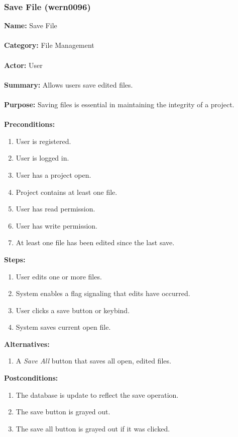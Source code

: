 \documentclass[11pt]{report}
\begin{document}
\subsubsection{Save File (wern0096)}
\begin{framed}
	\noindent\textbf{Name:} Save File \\ \\
	\textbf{Category:} File Management \\ \\
	\textbf{Actor:} User \\ \\
	\textbf{Summary:} Allows users save edited files. \\ \\
	\textbf{Purpose:} Saving files is essential in maintaining the integrity of a project. \\ \\
	\textbf{Preconditions:} 
	\begin{enumerate}
		\item User is registered.
		\item User is logged in.
		\item User has a project open.
		\item Project contains at least one file.
		\item User has read permission.
		\item User has write permission.
		\item At least one file has been edited since the last save.
	\end{enumerate}		
	\textbf{Steps:}
	\begin{enumerate}
		\item User edits one or more files.
		\item System enables a flag signaling that edits have occurred.
		\item User clicks a save button or keybind.
		\item System saves current open file.
	\end{enumerate}	
	\textbf{Alternatives:} 
	\begin{enumerate}
		\item A \textit{Save All} button that saves all open, edited files.
	\end{enumerate}
	\textbf{Postconditions:}
	\begin{enumerate}
		\item The database is update to reflect the save operation.
		\item The save button is grayed out.
		\item The save all button is grayed out if it was clicked.
	\end{enumerate}
\end{framed}
\end{document}
